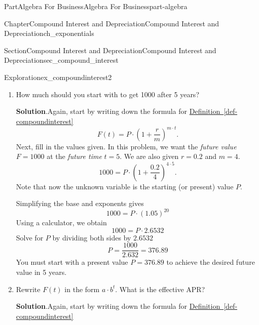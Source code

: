 \documentclass{tufte-book}
\newcommand{\blocktitlefont}{\relax}
\newcommand{\xreffont}{\relax}
\numberwithin{equation}{chapter}
\begin{document}
\begin{partptx}{Part}{Algebra For Business}{}{Algebra For Business}{}{}{part-algebra}
\begin{chapterptx}{Chapter}{Compound Interest and Depreciation}{}{Compound Interest and Depreciation}{}{}{ch_exponentials}
\begin{sectionptx}{Section}{Compound Interest and Depreciation}{}{Compound Interest and Depreciation}{}{}{sec_compound_interest}
\begin{exploration}{Exploration}{}{ex_compoundinterest2}
\begin{enumerate}[font=\bfseries,label=(\alph*),ref=\alph*]
We could stop there, but it is often nice to clean this up by  simplifying the base of the exponent to get a formula for the value after \(t\) years%
\begin{equation*}
F(t) = 100 \cdot \left(1.05 \right)^{4\cdot t}
\end{equation*}
%
\par
To find the value after one year, plug in \(t=1\) and simplify,%
\begin{equation*}
F(1) = 100 \cdot \left(1.05 \right)^{4\cdot 1} = \dots = 100\cdot 1.2155 = 121.55
\end{equation*}
%
\item{}How much should you start with to get \textdollar{}1000 after 5 years?%
\par\smallskip%
\noindent\textbf{\blocktitlefont Solution}.\hypertarget{ex_compoundinterest2-3-2}{}\quad{}Again, start by writing down the formula for  \hyperref[def-compoundinterest]{Definition~{\xreffont\ref{def-compoundinterest}}}%
\begin{equation*}
F(t) = P \cdot \left(1 + \frac{r}{m}\right)^{m\cdot t}\text{.}
\end{equation*}
Next, fill in the values given.  In this problem, we want the \emph{future value} \(F=1000\) at the \emph{future time} \(t=5\). We are also given \(r=0.2\) and \(m=4\).%
\begin{equation*}
1000 = P \cdot \left(1 + \frac{0.2}{4}\right)^{4\cdot 5}\text{.}
\end{equation*}
Note that now the unknown variable is the starting (or present) value \(P\).%
\par
Simplifying the base and exponents gives%
\begin{equation*}
1000 = P \cdot \left(1.05\right)^{20}
\end{equation*}
Using a calculator, we obtain%
\begin{equation*}
1000 = P \cdot 2.6532
\end{equation*}
Solve for \(P\) by dividing both sides by \(2.6532\)%
\begin{equation*}
P = \dfrac{1000}{2.632} = 376.89
\end{equation*}
You must start with a present value \(P=376.89\) to achieve the desired future value in 5 years.%
\item{}Rewrite \(F(t)\) in the form \(a\cdot b^t\).  What is the effective APR?%
\par\smallskip%
\noindent\textbf{\blocktitlefont Solution}.\hypertarget{ex_compoundinterest2-4-2}{}\quad{}Again, start by writing down the formula for  \hyperref[def-compoundinterest]{Definition~{\xreffont\ref{def-compoundinterest}}}%

\end{enumerate}
\end{exploration}
\end{sectionptx}
\end{chapterptx}
\end{partptx}
\end{document}
